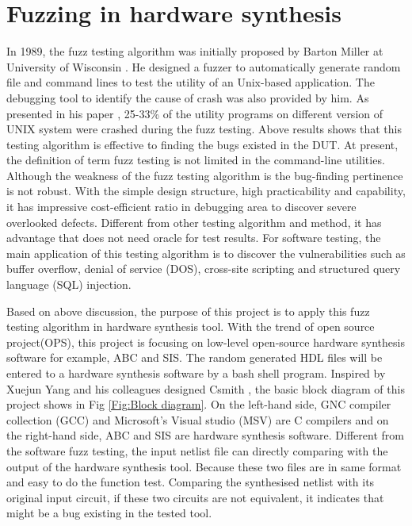 \section{Fuzzing in hardware synthesis}
In 1989, the fuzz testing algorithm was initially proposed by Barton Miller at University of Wisconsin \cite{miller2007fuzz}. He designed a fuzzer to automatically generate random file and command lines to test the utility of an Unix-based application. The debugging tool to identify the cause of crash was also provided by him. As presented in his paper \cite{miller1990empirical}, 25-33\% of the utility programs on different version of UNIX system were crashed during the fuzz testing. Above results shows that this testing algorithm is effective to finding the bugs existed in the DUT. At present, the definition of term fuzz testing is not limited in the command-line utilities.
Although the weakness of the fuzz testing algorithm is the bug-finding pertinence is not robust. 
With the simple design structure, high practicability and capability, it has impressive cost-efficient ratio in debugging area to discover severe overlooked defects. Different from other testing algorithm and method, it has advantage that does not need oracle for test results. For software testing, the main application of this testing algorithm is to discover the vulnerabilities such as buffer overflow,
denial of service (DOS), cross-site scripting and structured query language (SQL) injection\cite{Yang:2011:FUB:1993316.1993532}. 

Based on above discussion, the purpose of this project is to apply this fuzz testing algorithm in hardware synthesis tool. With the trend of open source project(OPS), this project is focusing on low-level open-source hardware synthesis software for example, ABC and SIS. The random generated HDL files will be entered to a hardware synthesis software by a bash shell program. Inspired by Xuejun Yang and his colleagues designed Csmith \cite{Yang:2011:FUB:1993316.1993532}, the basic block diagram of this project shows in Fig \ref{Fig:Block diagram}. On the left-hand side, GNC compiler collection (GCC) and Microsoft's Visual studio (MSV) are C compilers and on the right-hand side, ABC and SIS are hardware synthesis software. Different from the software fuzz testing, the input netlist file can directly comparing with the output of the hardware synthesis tool. Because these two files are in same format and easy to do the function test. Comparing the synthesised netlist with its original input circuit, if these two circuits are not equivalent, it indicates that might be a bug existing in the tested tool. 

